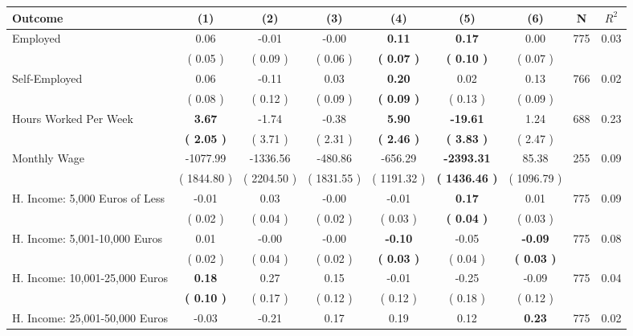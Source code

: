 \begin{tabular}{lcccccccc}
\toprule
 \textbf{Outcome} & \textbf{(1)} & \textbf{(2)} & \textbf{(3)} & \textbf{(4)} & \textbf{(5)} & \textbf{(6)} & \textbf{N} & \textbf{$ R^2$} \\
\midrule
Employed &      0.06 &     -0.01 &     -0.00 & \textbf{     0.11} & \textbf{     0.17} &      0.00 & 775 &       0.03 \\ 
 & (     0.05 ) & (     0.09 ) & (     0.06 ) & \textbf{(     0.07 )} & \textbf{(     0.10 )} & (     0.07 ) & \\
Self-Employed &      0.06 &     -0.11 &      0.03 & \textbf{     0.20} &      0.02 &      0.13 & 766 &       0.02 \\ 
 & (     0.08 ) & (     0.12 ) & (     0.09 ) & \textbf{(     0.09 )} & (     0.13 ) & (     0.09 ) & \\
Hours Worked Per Week & \textbf{     3.67} &     -1.74 &     -0.38 & \textbf{     5.90} & \textbf{   -19.61} &      1.24 & 688 &       0.23 \\ 
 & \textbf{(     2.05 )} & (     3.71 ) & (     2.31 ) & \textbf{(     2.46 )} & \textbf{(     3.83 )} & (     2.47 ) & \\
Monthly Wage &  -1077.99 &  -1336.56 &   -480.86 &   -656.29 & \textbf{ -2393.31} &     85.38 & 255 &       0.09 \\ 
 & (  1844.80 ) & (  2204.50 ) & (  1831.55 ) & (  1191.32 ) & \textbf{(  1436.46 )} & (  1096.79 ) & \\
H. Income: 5,000 Euros of Less &     -0.01 &      0.03 &     -0.00 &     -0.01 & \textbf{     0.17} &      0.01 & 775 &       0.09 \\ 
 & (     0.02 ) & (     0.04 ) & (     0.02 ) & (     0.03 ) & \textbf{(     0.04 )} & (     0.03 ) & \\
H. Income: 5,001-10,000 Euros &      0.01 &     -0.00 &     -0.00 & \textbf{    -0.10} &     -0.05 & \textbf{    -0.09} & 775 &       0.08 \\ 
 & (     0.02 ) & (     0.04 ) & (     0.02 ) & \textbf{(     0.03 )} & (     0.04 ) & \textbf{(     0.03 )} & \\
H. Income: 10,001-25,000 Euros & \textbf{     0.18} &      0.27 &      0.15 &     -0.01 &     -0.25 &     -0.09 & 775 &       0.04 \\ 
 & \textbf{(     0.10 )} & (     0.17 ) & (     0.12 ) & (     0.12 ) & (     0.18 ) & (     0.12 ) & \\
H. Income: 25,001-50,000 Euros &     -0.03 &     -0.21 &      0.17 &      0.19 &      0.12 & \textbf{     0.23} & 775 &       0.02 \\ 

\end{tabular}
